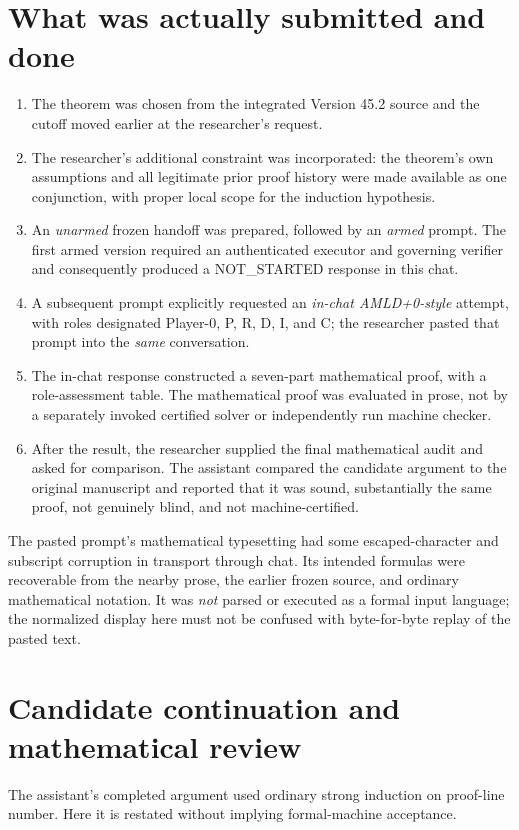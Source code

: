 \documentclass[11pt,letterpaper]{article}
\newcommand{\Status}[1]{\textsf{#1}}
\begin{document}
\section{What was actually submitted and done}
\begin{enumerate}
\item The theorem was chosen from the integrated Version 45.2 source and the cutoff moved earlier at the researcher's request.
\item The researcher's additional constraint was incorporated: the theorem's own assumptions and all legitimate prior proof history were made available as one conjunction, with proper local scope for the induction hypothesis.
\item An \emph{unarmed} frozen handoff was prepared, followed by an \emph{armed} prompt. The first armed version required an authenticated executor and governing verifier and consequently produced a \Status{NOT\_STARTED} response in this chat.
\item A subsequent prompt explicitly requested an \emph{in-chat AMLD+0-\allowbreak style} attempt, with roles designated Player-0, P, R, D, I, and C; the researcher pasted that prompt into the \emph{same} conversation.
\item The in-chat response constructed a seven-part mathematical proof, with a role-assessment table. The mathematical proof was evaluated in prose, not by a separately invoked certified solver or independently run machine checker.
\item After the result, the researcher supplied the final mathematical audit and asked for comparison. The assistant compared the candidate argument to the original manuscript and reported that it was sound, substantially the same proof, not genuinely blind, and not machine-certified.
\end{enumerate}
The pasted prompt's mathematical typesetting had some escaped-character and subscript corruption in transport through chat. Its intended formulas were recoverable from the nearby prose, the earlier frozen source, and ordinary mathematical notation. It was \emph{not} parsed or executed as a formal input language; the normalized display here must not be confused with byte-for-byte replay of the pasted text.

\section{Candidate continuation and mathematical review}
The assistant's completed argument used ordinary strong induction on proof-line number. Here it is restated without implying formal-machine acceptance.
\end{document}
